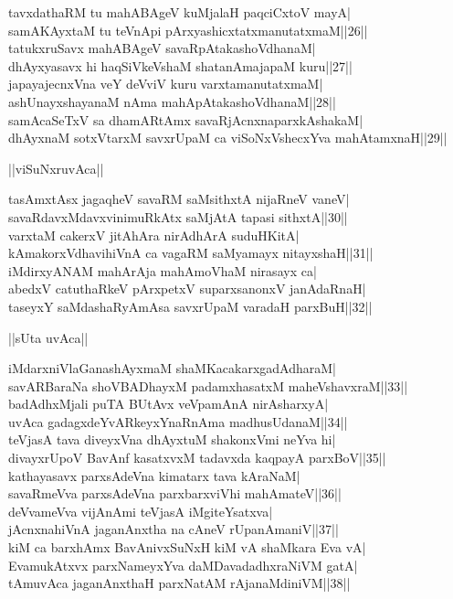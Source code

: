 \documentclass{article}
\begin{document}
tavxdathaRM tu mahABAgeV kuMjalaH paqciCxtoV mayA|\\
samAKAyxtaM tu teVnApi pArxyashicxtatxmanutatxmaM||26||\\
tatukxruSavx mahABAgeV savaRpAtakashoVdhanaM|\\
dhAyxyasavx hi haqSiVkeVshaM shatanAmajapaM kuru||27||\\
japayajecnxVna veY deVviV kuru varxtamanutatxmaM|\\
ashUnayxshayanaM nAma mahApAtakashoVdhanaM||28||\\
samAcaSeTxV sa dhamARtAmx savaRjAcnxnaparxkAshakaM|\\
dhAyxnaM sotxVtarxM savxrUpaM ca viSoNxVshecxYva mahAtamxnaH||29||\\

\begin{center}
||viSuNxruvAca||
\end{center}

tasAmxtAsx jagaqheV savaRM saMsithxtA nijaRneV vaneV|\\
savaRdavxMdavxvinimuRkAtx saMjAtA tapasi sithxtA||30||\\
varxtaM cakerxV jitAhAra nirAdhArA suduHKitA|\\
kAmakorxVdhavihiVnA ca vagaRM saMyamayx nitayxshaH||31||\\
iMdirxyANAM mahArAja mahAmoVhaM nirasayx ca|\\
abedxV catuthaRkeV pArxpetxV suparxsanonxV janAdaRnaH|\\
taseyxY saMdashaRyAmAsa savxrUpaM varadaH parxBuH||32||\\

\begin{center}
||sUta uvAca||
\end{center}

iMdarxniVlaGanashAyxmaM shaMKacakarxgadAdharaM|\\
savARBaraNa shoVBADhayxM padamxhasatxM maheVshavxraM||33||\\
badAdhxMjali puTA BUtAvx veVpamAnA nirAsharxyA|\\
uvAca gadagxdeYvARkeyxYnaRnAma madhusUdanaM||34||\\
teVjasA tava diveyxVna dhAyxtuM shakonxVmi neYva hi|\\
divayxrUpoV BavAnf kasatxvxM tadavxda kaqpayA parxBoV||35||\\
kathayasavx parxsAdeVna kimatarx tava kAraNaM|\\
savaRmeVva parxsAdeVna parxbarxviVhi mahAmateV||36||\\
deVvameVva vijAnAmi teVjasA iMgiteYsatxva|\\
jAcnxnahiVnA jaganAnxtha na cAneV rUpanAmaniV||37||\\
kiM ca barxhAmx BavAnivxSuNxH kiM vA shaMkara Eva vA|\\
EvamukAtxvx parxNameyxYva daMDavadadhxraNiVM gatA|\\
tAmuvAca jaganAnxthaH parxNatAM rAjanaMdiniVM||38||\\
\end{document}
